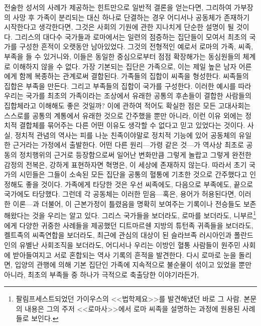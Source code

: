 전술한 성서의 사례가 제공하는 힌트만으로
일반적 결론을 얻는다면,
그리하여
가부장의 사망 후 가족이 분리되는 대신 하나로 단결하는 경우 어디서나
공동체가 존재하기 시작한다고 생각한다면,
그것은 사회의 기원에 관한 지나치게 단순한 설명이 될 것이다.
그리스의 대다수 국가들과 로마에서는
일련의 점증하는 집단들이 모여서 최초의 국가를 구성한
흔적이 오랫동안 남아있었다.
그것의 전형적인 예로서
로마의 가족, 씨족, 부족을
들 수 있거니와,
이들은 동일한 중심으로부터 점점 확장해가는 동심원들의 체계로
이해하지 않을 수 없다.
가장 기본되는 집단은 가족으로, 이는
제일 높은 남자 어른에게 함께 복종하는 관계로써 결합된다.
가족들의 집합이 씨족을 형성한다.
씨족들의 집합은 부족을 만든다.
그리고 부족들의 집합이 국가를 구성한다.
이러한 예시를 따라 우리는 국가를
최초의 가족이라는 조상에서 유래한 공통의 후손들이 결합한
사람들의 집합체라고 이해해도 좋은 것일까?
이에 관하여 적어도 확실한 점은
모든 고대사회는 스스로를 공통의 계통에서 유래한 것으로 간주했을 뿐만 아니라,
이런 이유 외에는 정치적 결합체를 묶어주는
다른 어떤 이유도 생각할 수 없다고 믿고 있었다는 것이다.
사실, 정치적 관념의 역사는
피를 나눈 친족이야말로
정치적 기능에 있어 공동체의 유일한 근거라는 가정에서 출발한다.
어떤 다른 원리---가령 
같은 것---가 역사상 최초로 공동의 정치행위의 근거로 등장함으로써
일어난 변화만큼 그렇게 놀랍고 그렇게 완전한 감정의 전복은,
강하게 표현하자면 혁명은, 이 세상에 존재하지 않는다.
따라서 초기 국가의 시민들은
그들이 소속된 모든 집단을 공통의 혈통에 기초한 것으로 간주했다고
인정해도 좋을 것이다.
가족에게 타당한 것은 우선 씨족에도, 다음으로 부족에도, 끝으로 국가에도 타당했다.
그런데
각 공동체는
이러한 믿음---혹은, 용어가 허용된다면, 이러한 이론---과 더불어,
이 근본가정이 틀렸음을 명확히 보여주는 기록이나 전승들도
보존해왔다는 것을 우리는 알고 있다.
그리스 국가들을 보더라도, 로마를 보더라도,
니부르\footnote{팔림프세스트되었던
가이우스의 <<법학제요>>를 발견해냈던 바로 그 사람. 본문의 내용은
그의 주저 <<로마사>>에서 로마 씨족을 설명하는 과정에 원용된 사례들로 보인다.}%
에게 다양한 귀중한 사례들을 제공했던
디트마르쉔 지방의 튜턴족 귀족들을 보더라도,
켈트족의 씨족연합을 보더라도,
최근에 관심의 대상이 된
슬라브족 러시아인과 폴란드인의 유별난 사회조직을 보더라도,
어디서나 우리는
이방인 혈통 사람들이 원주민 사회에 받아들여지고 서로 혼합되는
역사 기록의 흔적을 발견한다.
다시 로마로 눈을 돌리면,
입양의 관행에 의해
기본 집단인 가족에 지속적으로
불순물이 섞이고 있었을 뿐만 아니라,
최초의 부족들 중 하나가 극적으로 축출당한 이야기라든가,%
